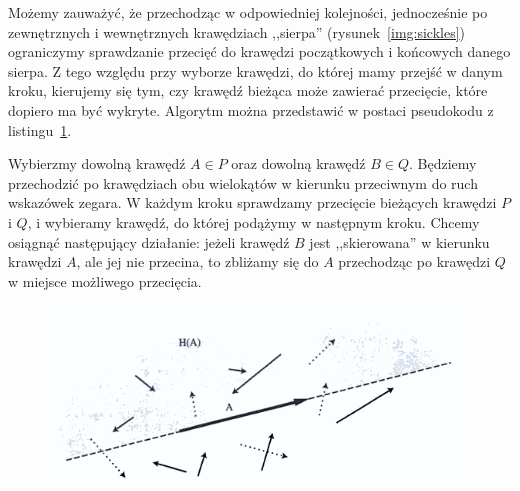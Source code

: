 Możemy zauważyć, że przechodząc w odpowiedniej kolejności,
jednocześnie po zewnętrznych i wewnętrznych krawędziach ,,sierpa''
(rysunek~\ref{img:sickles}) ograniczymy sprawdzanie przecięć do
krawędzi początkowych i końcowych danego sierpa. Z tego względu przy
wyborze krawędzi, do której mamy przejść w danym kroku, kierujemy się
tym, czy krawędź bieżąca może zawierać przecięcie, które dopiero ma
być wykryte. Algorytm można przedstawić w postaci pseudokodu z
listingu~\ref{alg:Orourke98}.

\begin{figure}[htp]

  \begin{algorithmic}[1]


     \Repeat

    \EndProcedure
  \end{algorithmic}
  \caption{\label{alg:Orourke98}}
\end{figure}

Wybierzmy dowolną krawędź $A \in P$ oraz dowolną krawędź $B \in
Q$. Będziemy przechodzić po krawędziach obu wielokątów w kierunku
przeciwnym do ruch wskazówek zegara. W każdym kroku sprawdzamy
przecięcie bieżących krawędzi $P$ i $Q$, i wybieramy krawędź, do
której podążymy w następnym kroku.  Chcemy osiągnąć następujący
działanie: jeżeli krawędź $B$ jest ,,skierowana'' w kierunku krawędzi
$A$, ale jej nie przecina, to zbliżamy się do $A$ przechodząc po
krawędzi $Q$ w miejsce możliwego przecięcia.

\begin{figure}[htb]
  \centering
  \includegraphics[scale=0.7]{img/vectors}
  \caption{\label{img:advance}}
\end{figure}

